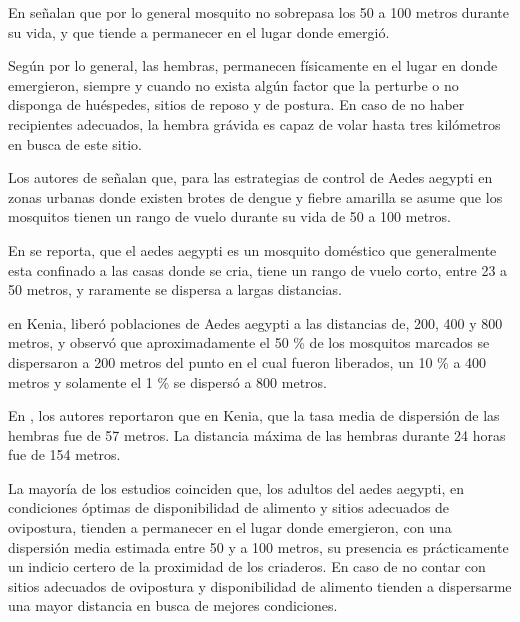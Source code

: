 En \citet{cabezas2005dengue} señalan que por lo general mosquito no sobrepasa los 50 a 100 metros
durante su vida, y que tiende a permanecer en el lugar donde emergió.

Según \citet{ThironIzcazaJ2003} por lo general, las hembras, permanecen físicamente en el lugar en
donde emergieron, siempre y cuando no exista algún factor que la perturbe o no disponga de
huéspedes, sitios de reposo y de postura. En caso de no haber recipientes adecuados, la hembra
grávida es capaz de volar hasta tres kilómetros en busca de este sitio.

Los autores de \citet{dengueUruguayCap8} señalan que, para las estrategias de control de Aedes
aegypti en zonas urbanas donde existen brotes de dengue y fiebre amarilla se asume que los
mosquitos tienen un rango de vuelo durante su vida de 50 a 100 metros.

En \citet{luevano1993ciclo} se reporta, que el aedes aegypti es un mosquito doméstico que
generalmente esta confinado a las casas donde se cria, tiene un rango de vuelo corto, entre 23 a
50 metros, y raramente se dispersa a largas distancias.

\citet{mcdonald1977population} en Kenia, liberó poblaciones de Aedes aegypti a las distancias de,
200, 400 y 800 metros, y observó que aproximadamente el 50 \% de los mosquitos marcados se
dispersaron a 200 metros del punto en el cual fueron liberados, un 10 \% a 400 metros y solamente
el 1 \% se dispersó a 800 metros.

En \citet{trpis1986dispersal}, los autores reportaron que en Kenia, que la tasa media de dispersión
de las hembras fue de 57 metros. La distancia máxima de las hembras durante 24 horas fue de 154
metros.

La mayoría de los estudios coinciden que, los adultos del aedes aegypti, en condiciones óptimas de
disponibilidad de alimento y sitios adecuados de ovipostura, tienden a permanecer en el lugar
donde emergieron, con una dispersión media estimada entre 50 y a 100 metros, su presencia es
prácticamente un indicio certero de la proximidad de los criaderos. En caso de no contar con
sitios adecuados de ovipostura y disponibilidad de alimento tienden a dispersarme una mayor
distancia en busca de mejores condiciones.
